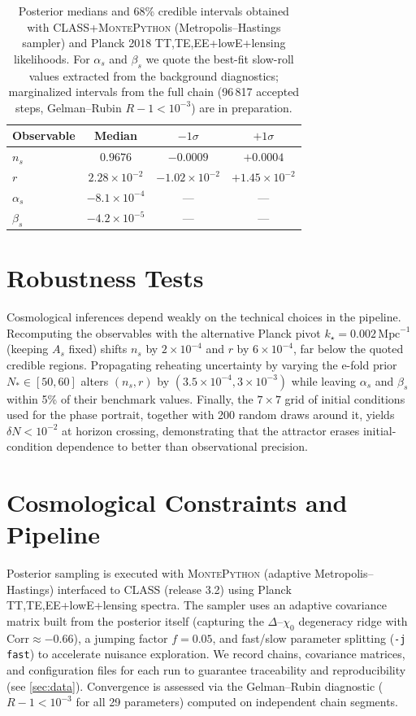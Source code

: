 \documentclass[11pt,a4paper]{article}
\begin{document}
\begin{table}[t]
    \centering
    \caption{Posterior medians and 68\% credible intervals obtained with \textsc{CLASS}+\textsc{MontePython} (Metropolis--Hastings sampler) and Planck 2018 TT,TE,EE+lowE+lensing likelihoods. For $\alpha_{s}$ and $\beta_{s}$ we quote the best-fit slow-roll values extracted from the background diagnostics; marginalized intervals from the full chain (96\,817 accepted steps, Gelman--Rubin $R-1<10^{-3}$) are in preparation.}
    \begin{tabular}{lccc}
        \toprule
        Observable & Median & $-1\sigma$ & $+1\sigma$ \\
        \midrule
        $n_{s}$ & $0.9676$ & $-0.0009$ & $+0.0004$ \\
        $r$ & $2.28\times10^{-2}$ & $-1.02\times10^{-2}$ & $+1.45\times10^{-2}$ \\
        $\alpha_{s}$ & $-8.1\times10^{-4}$ & --- & --- \\
        $\beta_{s}$ & $-4.2\times10^{-5}$ & --- & --- \\
        \bottomrule
    \end{tabular}
    \label{tab:observables}
\end{table}

\section{Robustness Tests}
\label{sec:robustness}
Cosmological inferences depend weakly on the technical choices in the pipeline. Recomputing the observables with the alternative Planck pivot $k_{\star}=0.002\,\mathrm{Mpc}^{-1}$ (keeping $A_{s}$ fixed) shifts $n_{s}$ by $2\times10^{-4}$ and $r$ by $6\times10^{-4}$, far below the quoted credible regions. Propagating reheating uncertainty by varying the e-fold prior $N_{*}\in[50,60]$ alters $(n_{s},r)$ by $(3.5\times10^{-4},3\times10^{-3})$ while leaving $\alpha_{s}$ and $\beta_{s}$ within 5\% of their benchmark values. Finally, the $7\times7$ grid of initial conditions used for the phase portrait, together with 200 random draws around it, yields $\delta N<10^{-2}$ at horizon crossing, demonstrating that the attractor erases initial-condition dependence to better than observational precision.

\section{Cosmological Constraints and Pipeline}
\label{sec:constraints}
Posterior sampling is executed with \textsc{MontePython} (adaptive Metropolis--Hastings) interfaced to \textsc{CLASS} (release 3.2) using Planck TT,TE,EE+lowE+lensing spectra. The sampler uses an adaptive covariance matrix built from the posterior itself (capturing the $\Delta$--$\chi_0$ degeneracy ridge with $\mathrm{Corr}\approx-0.66$), a jumping factor $f=0.05$, and fast/slow parameter splitting (\texttt{-j fast}) to accelerate nuisance exploration. We record chains, covariance matrices, and configuration files for each run to guarantee traceability and reproducibility (see \cref{sec:data}). Convergence is assessed via the Gelman--Rubin diagnostic ($R-1<10^{-3}$ for all 29 parameters) computed on independent chain segments.
\end{document}
